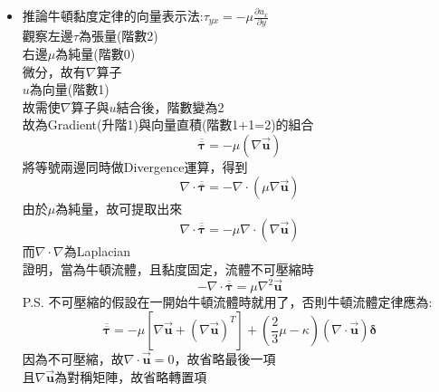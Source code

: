 \documentclass[../main.tex]{subfiles}
\begin{document}
\begin{itemize}
\begin{itemize}
\begin{equation}
          \rho (\nabla \cdot \vec {\bm u}), \quad \text{階數: 0 + (-1 + 1) = 0}
        \end{equation}
        提取$\vec {\bm u}$作用於$\rho$時，由於$\vec {\bm u}$(階數1)，故需作來降階為0\\
        並且內積的對象要是階數1(1+1-2=0)，故$\rho$(階數0)需作Gradient(升階1)來達成
        \begin{equation}
          \vec {\bm u} \cdot (\nabla \rho), \quad \text{階數: 1 -2 (+1 + 0) = 0}
        \end{equation}
        綜合以上兩項，得到分配律:
        \begin{equation}
          \nabla \cdot (\rho \vec {\bm u})  = \rho (\nabla \cdot \vec {\bm u}) + \vec {\bm u} \cdot (\nabla \rho)
        \end{equation}
      \item 推論牛頓黏度定律的向量表示法:$\tau_{yx} = -\mu \frac{\partial u_x}{\partial y}$\\
        觀察左邊$\tau$為張量(階數2)\\
        右邊$\mu$為純量(階數0)\\
        微分，故有$\nabla$算子\\
        $u$為向量(階數1)\\
        故需使$\nabla$算子與$u$結合後，階數變為2\\
        故為Gradient(升階1)與向量直積(階數1+1=2)的組合
        \begin{equation}
          \overline{\overline {\bm \tau}} = -\mu (\nabla \vec {\bm u})
        \end{equation}
        將等號兩邊同時做Divergence運算，得到
        \begin{equation}
          \nabla \cdot \overline{\overline {\bm \tau}} = -\nabla \cdot \left(\mu \nabla \vec {\bm u} \right)
        \end{equation}
        由於$\mu$為純量，故可提取出來
        \begin{equation}
          \nabla \cdot \overline{\overline {\bm \tau}} = -\mu \nabla \cdot( \nabla \vec {\bm u})
        \end{equation}
        而$\nabla \cdot \nabla$為Laplacian\\
        證明，當為牛頓流體，且黏度固定，流體不可壓縮時
        \begin{equation}
          -\nabla \cdot \overline{\overline {\bm \tau}} = \mu \nabla^2 \vec {\bm u}
        \end{equation}
        P.S. 不可壓縮的假設在一開始牛頓流體時就用了，否則牛頓流體定律應為:
        \begin{equation}
          \overline{\overline {\bm \tau}} = -\mu \left[ \nabla \vec {\bm u} + (\nabla \vec {\bm u})^T\right]
           + \left(
            \frac{2}{3}\mu - \kappa 
           \right)\left(
            \nabla \cdot \vec {\bm u}
           \right)\bm \delta           
        \end{equation}
        因為不可壓縮，故$\nabla \cdot \vec {\bm u} = 0$，故省略最後一項\\
        且$\nabla \vec {\bm u}$為對稱矩陣，故省略轉置項
    \end{itemize}
\end{itemize}
\end{document}
